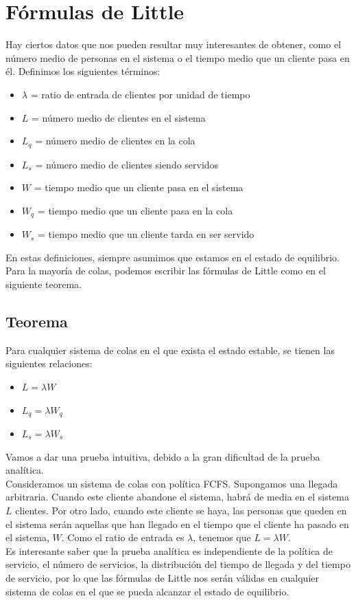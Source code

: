 	\section{Fórmulas de Little}
	Hay ciertos datos que nos pueden resultar muy interesantes de obtener, como el n\'umero medio de personas en el sistema o el tiempo medio que un cliente pasa en \'el. Definimos los siguientes t\'erminos:
	\begin{itemize}
		\item $\lambda$ = ratio de entrada de clientes por unidad de tiempo
		\item$L$ = n\'umero medio de clientes en el sistema
		\item$L_q$ = n\'umero medio de clientes en la cola
		\item$L_s$ = n\'umero medio de clientes siendo servidos
		\item$W$ = tiempo medio que un cliente pasa en el sistema
		\item$W_q$ = tiempo medio que un cliente pasa en la cola
		\item$W_s$ = tiempo medio que un cliente tarda en ser servido
	\end{itemize}
\hspace{0.5cm}	En estas definiciones, siempre asumimos que estamos en el estado de equilibrio. Para la mayor\'ia de colas, podemos escribir las f\'ormulas de Little como en el siguiente teorema.
	\subsection{Teorema}
	Para cualquier sistema de colas en el que exista el estado estable, se tienen las siguientes relaciones:
	\begin{itemize}
		\item $L=\lambda W$
		\item$L_q=\lambda W_q$
		\item$L_s=\lambda W_s$
	\end{itemize}
\hspace{0.5cm}	Vamos a dar una prueba intuitiva, debido a la gran dificultad de la prueba anal\'itica. \\
\hspace{0.5cm}Consideramos un sistema de colas con pol\'itica FCFS. Supongamos una llegada arbitraria. Cuando este cliente abandone el sistema, habr\'a de media en el sistema $L$ clientes. Por otro lado, cuando este cliente se haya, las personas que queden en el sistema ser\'an aquellas que han llegado en el tiempo que el cliente ha pasado en el sistema, $W$. Como el ratio de entrada es $\lambda$, tenemos que $L=\lambda W$.\\
\hspace{0.5cm}	Es interesante saber que la prueba anal\'itica es independiente de la pol\'itica de servicio, el n\'umero de servicios, la distribuci\'on del tiempo de llegada y del tiempo de servicio, por lo que las f\'ormulas de Little nos ser\'an v\'alidas en cualquier sistema de colas en el que se pueda alcanzar el estado de equilibrio.

